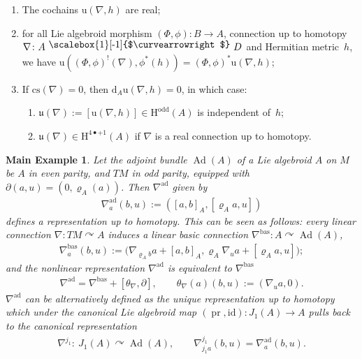 \documentclass[pdftex]{sigma}
\numberwithin{equation}{section}
\newcommand{\acts}{\curvearrowright}
\newcommand{\homo}{ \ \raisebox{\depth}{\scalebox{1}[-1]{$\curvearrowright$}} \ }
\newcommand{\bd}{\partial}
\newcommand{\pr}{\operatorname{pr}}
\newcommand{\dd}{\mathrm{d}}
\newcommand{\id}{\mathrm{id}}
\newcommand{\8}{\infty}
\newtheorem*{main_example}{Main Example}
\begin{document}
\begin{proposition}\label{pro : secondary}\quad
 \begin{enumerate}\itemsep=0pt
 \item[$a)$] The cochains $\mathrm{u}(\nabla,h)$ are real;
 \item[$b)$] for all Lie algebroid morphism $(\Phi,\phi)\colon B \to A$, connection up to homotopy $\nabla\colon A \homo D$ and Hermitian metric~$h$, we have $\mathrm{u}((\Phi,\phi)^!(\nabla),\phi^*(h)) = (\Phi,\phi)^*\mathrm{u}(\nabla,h)$;
 \item[$c)$] If $\mathrm{cs}(\nabla)=0$, then $\dd_A\mathrm{u}(\nabla,h)=0$, in which case:
 \begin{enumerate}\itemsep=0pt
 \item[$i)$] $\mathfrak{u}(\nabla):=[\mathrm{u}(\nabla,h)] \in \mathrm{H}^{\mathrm{odd}}(A)$ is independent of~$h$;
 \item[$ii)$] $\mathfrak{u}(\nabla) \in \mathrm{H}^{4\bullet+1}(A)$ if $\nabla$ is a real connection up to homotopy.
 \end{enumerate}
 \end{enumerate}
\end{proposition}

\begin{main_example}Let the \emph{adjoint bundle} $\operatorname{Ad}(A)$ of a Lie algebroid $A$ on $M$ be $A$ in even parity, and $TM$ in odd parity, equipped with $\bd(a,u) = (0,\varrho_A(a))$. Then $\nabla^{\mathrm{ad}}$ given by
\begin{gather*}
 \nabla^{\mathrm{ad}}_a(b,u):=([a,b]_A,[\varrho_Aa,u])
\end{gather*}defines a representation up to homotopy. This can be seen as follows:
every linear connection $\nabla\colon TM \acts A$ induces a linear {\it basic connection} $\nabla^{\mathrm{bas}} \colon A \acts \operatorname{Ad}(A)$,
\begin{align*}
\nabla^{\mathrm{bas}}_a(b,u):=\big(\nabla_{\varrho_A b}a+[a,b]_A,\varrho_A\nabla_{u}a+[\varrho_A a,u]\big);
\end{align*}and the nonlinear representation $\nabla^{\mathrm{ad}}$ is equivalent to $\nabla^{\mathrm{bas}}$
\begin{gather*}
\nabla^{\mathrm{ad}}=\nabla^{\mathrm{bas}} + [\theta_{\nabla},\bd], \qquad \theta_{\nabla}(a)(b,u):=(\nabla_ua,0).
\end{gather*}$\nabla^{\mathrm{ad}}$ can be alternatively defined as the unique representation up to homotopy which under the canonical Lie algebroid map $(\pr,\id)\colon J_1(A) \to A$ pulls back to the canonical representation
\begin{gather*}
\nabla^{j_1}\colon \ J_1(A) \acts \operatorname{Ad}(A), \qquad \nabla^{j_1}_{j_1a}(b,u) = \nabla^{\mathrm{ad}}_a(b,u).
\end{gather*}
\end{main_example}
\end{document}
